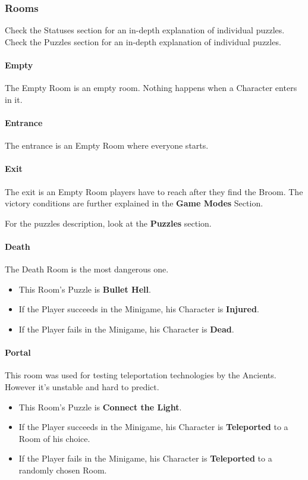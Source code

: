 \subsubsection{Rooms}

Check the Statuses section for an in-depth explanation of individual puzzles.
Check the Puzzles section for an in-depth explanation of individual puzzles.

\paragraph{Empty} The Empty Room is an empty room. Nothing happens when a Character enters in it.

\paragraph{Entrance} The entrance is an Empty Room where everyone starts.

\paragraph{Exit} The exit is an Empty Room players have to reach after they find the Broom. The victory conditions are further explained in the \textbf{Game Modes} Section.

For the puzzles description, look at the \textbf{Puzzles} section.

\paragraph{Death} The Death Room is the most dangerous one.
\begin{itemize}
	\item This Room's Puzzle is \textbf{Bullet Hell}.
	\item If the Player succeeds in the Minigame, his Character is \textbf{Injured}.
	\item If the Player fails    in the Minigame, his Character is \textbf{Dead}.
\end{itemize}

\paragraph{Portal} This room was used for testing teleportation technologies by the Ancients. However it's unstable and hard to predict.
\begin{itemize}
	\item This Room's Puzzle is \textbf{Connect the Light}.
	\item If the Player succeeds in the Minigame, his Character is \textbf{Teleported} to a Room of his choice.
	\item If the Player fails    in the Minigame, his Character is \textbf{Teleported} to a randomly chosen Room.
\end{itemize}

